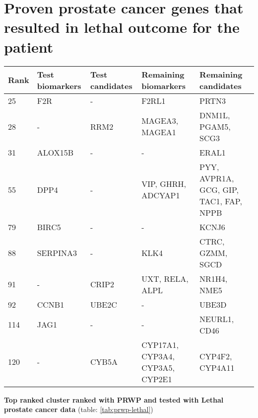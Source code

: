 \section{Proven prostate cancer genes that resulted in lethal outcome for the patient}
\begin{sidewaystable}
    \begin{tabular}{|l|l|l|l|l|}
        \hline
        \textbf{Rank}
        & \textbf{Test biomarkers}
        & \textbf{Test candidates}
        & \textbf{Remaining biomarkers}
        & \textbf{Remaining candidates} \\
        \hline
        25	& F2R	& -	& F2RL1	& PRTN3 \\
        \hline
        28	& -	& RRM2	& MAGEA3, MAGEA1	& DNM1L, PGAM5, SCG3 \\
        \hline
        31	& ALOX15B	& -	& -	& ERAL1 \\
        \hline
        55	& DPP4	& -	& VIP, GHRH, ADCYAP1	& PYY, AVPR1A, GCG, GIP, TAC1, FAP, NPPB \\
        \hline
        79	& BIRC5	& -	& -	& KCNJ6 \\
        \hline
        88	& SERPINA3	& -	& KLK4	& CTRC, GZMM, SGCD \\
        \hline
        91	& -	& CRIP2	& UXT, RELA, ALPL	& NR1H4, NME5 \\
        \hline
        92	& CCNB1	& UBE2C	& -	& UBE3D \\
        \hline
        114	& JAG1	& -	& -	& NEURL1, CD46 \\
        \hline
        120	& -	& CYB5A	& CYP17A1, CYP3A4, CYP3A5, CYP2E1	& CYP4F2, CYP4A11 \\
        \hline
    \end{tabular}
    \caption{iRefWeb network ranked with PRWP and lethal prostate cancer data
    - matched 99 test genes form the lethal prostate cancer data set out of 157
possible}
    \label{tab:prwp-lethal}
\end{sidewaystable}

\textbf{Top ranked cluster ranked with PRWP and tested with Lethal prostate cancer data}
(table: \ref{tab:prwp-lethal})

